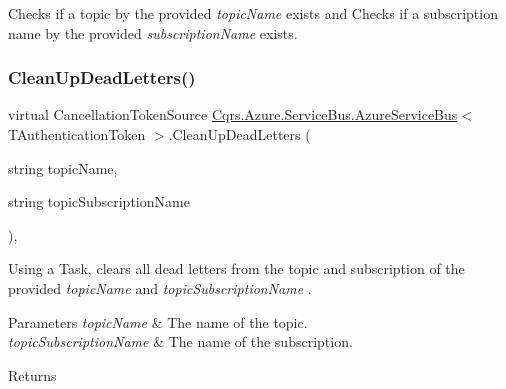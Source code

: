 Checks if a topic by the provided {\itshape topic\+Name}  exists and Checks if a subscription name by the provided {\itshape subscription\+Name}  exists. 

\mbox{\label{classCqrs_1_1Azure_1_1ServiceBus_1_1AzureServiceBus_a8d1d5833d49b7793933825f2a13fb8b7_a8d1d5833d49b7793933825f2a13fb8b7}} 
\subsubsection{\texorpdfstring{Clean\+Up\+Dead\+Letters()}{CleanUpDeadLetters()}}
{\footnotesize\ttfamily virtual Cancellation\+Token\+Source \hyperlink{classCqrs_1_1Azure_1_1ServiceBus_1_1AzureServiceBus}{Cqrs.\+Azure.\+Service\+Bus.\+Azure\+Service\+Bus}$<$ T\+Authentication\+Token $>$.Clean\+Up\+Dead\+Letters (\begin{DoxyParamCaption}\item[{string}]{topic\+Name,  }\item[{string}]{topic\+Subscription\+Name }\end{DoxyParamCaption})\hspace{0.3cm}{\ttfamily [protected]}, {\ttfamily [virtual]}}



Using a Task, clears all dead letters from the topic and subscription of the provided {\itshape topic\+Name}  and {\itshape topic\+Subscription\+Name} . 


\begin{DoxyParams}{Parameters}
{\em topic\+Name} & The name of the topic.\\
\hline
{\em topic\+Subscription\+Name} & The name of the subscription.\\
\hline
\end{DoxyParams}
\begin{DoxyReturn}{Returns}

\end{DoxyReturn}
\mbox{\label{classCqrs_1_1Azure_1_1ServiceBus_1_1AzureServiceBus_a5a3b3610dc5dfebe586262c0bc787748_a5a3b3610dc5dfebe586262c0bc787748}} 
